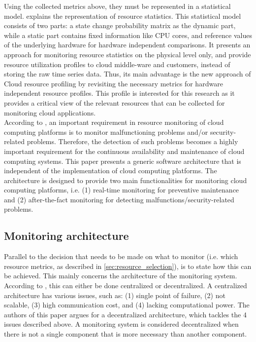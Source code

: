 \noindent
Using the collected metrics above, they must be represented in a statistical model. \cite{hauser2018reviewing} explains the representation of resource statistics. This statistical model consists of two parts: a state change probability matrix as the dynamic part, while a static part contains fixed information like CPU cores, and reference values of the underlying hardware for hardware independent comparisons. It presents an approach for monitoring resource statistics on the physical level only, and provide resource utilization profiles to cloud middle-ware and customers, instead of storing the raw time series data. Thus, its main advantage is the new approach of Cloud resource profiling by revisiting the necessary metrics for hardware independent resource profiles. This profile is interested for this research as it provides a critical view of the relevant resources that can be collected for monitoring cloud applications.\\


\noindent
According to \cite{aktas2018hybrid}, an important requirement in resource monitoring of cloud computing platforms is to monitor malfunctioning problems and/or security-related problems. Therefore, the detection of such problems becomes a highly important requirement for the continuous availability and maintenance of cloud computing systems. This paper presents a generic software architecture that is independent of the implementation of cloud computing platforms. The architecture is designed to provide two main functionalities for monitoring cloud computing platforms, i.e. (1) real-time monitoring for preventive maintenance and (2) after-the-fact monitoring for detecting malfunctions/security-related problems.\\

\subsection{Monitoring architecture} \label{sec:monitoring_architecture}
Parallel to the decision that needs to be made on what to monitor (i.e. which resource metrics, as described in \autoref{sec:resource_selection}), is to state how this can be achieved. This mainly concerns the architecture of the monitoring system. According to \cite{kumar2017inspection}, this can either be done centralized or decentralized. A centralized architecture has various issues, such as: (1) single point of failure, (2) not scalable, (3) high communication cost, and (4) lacking computational power. The authors of this paper argues for a decentralized architecture, which tackles the 4 issues described above. A monitoring system is considered decentralized when there is not a single component that is more necessary than another component.\\

